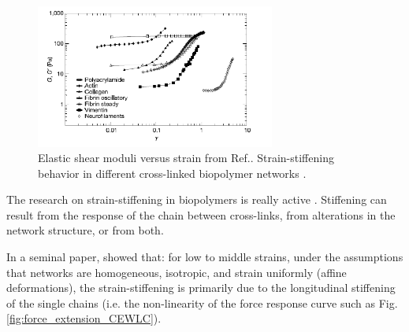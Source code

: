  \begin{figure}[ht]
\begin{center}
\includegraphics[width=0.7\textwidth,height=0.5\textwidth]{Figures/chapter-intro/strainstiffening_storm.png}%

\caption[Strain-stiffening in semiflexible
polymers]{ Elastic shear moduli versus
strain from Ref.\citep{storm_nonlinear_2005}. Strain-stiffening behavior in
different cross-linked biopolymer networks
\citep{carrillo_nonlinear_2013}.}
\label{fig:strainstiffening-storm}
\end{center}
\end{figure}


The research on strain-stiffening in biopolymers is really
active \citep{storm_nonlinear_2005, onck_alternative_2005,
head_distinct_2003,head_deformation_2003,wilhelm_elasticity_2003,huisman_three-dimensional_2007,yao_nonlinear_2011}.
Stiffening can result from the response of the chain between cross-links, from
alterations in the network structure, or from both.

 In a seminal paper,
\citet{storm_nonlinear_2005} showed that: for low to middle strains, under
the assumptions that networks are homogeneous, isotropic, and strain uniformly
(affine deformations), the strain-stiffening is primarily due to the
longitudinal stiffening of the single chains (i.e.
the non-linearity of the force response curve such as
Fig.\ref{fig:force_extension_CEWLC}).

